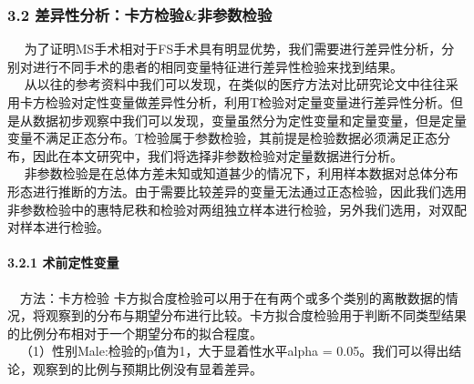 \documentclass[
]{article}
\newenvironment{Shaded}{\begin{snugshade}}{\end{snugshade}}
\newcommand{\AttributeTok}[1]{\textcolor[rgb]{0.77,0.63,0.00}{#1}}
\newcommand{\FunctionTok}[1]{\textcolor[rgb]{0.00,0.00,0.00}{#1}}
\newcommand{\NormalTok}[1]{#1}
\newcommand{\OtherTok}[1]{\textcolor[rgb]{0.56,0.35,0.01}{#1}}
\newcommand{\SpecialCharTok}[1]{\textcolor[rgb]{0.00,0.00,0.00}{#1}}
\newcommand{\StringTok}[1]{\textcolor[rgb]{0.31,0.60,0.02}{#1}}
\begin{document}
\hypertarget{ux5deeux5f02ux6027ux5206ux6790ux5361ux65b9ux68c0ux9a8cux975eux53c2ux6570ux68c0ux9a8c}{%
\subsubsection{3.2
差异性分析：卡方检验\&非参数检验}\label{ux5deeux5f02ux6027ux5206ux6790ux5361ux65b9ux68c0ux9a8cux975eux53c2ux6570ux68c0ux9a8c}}

 
为了证明MS手术相对于FS手术具有明显优势，我们需要进行差异性分析，分别对进行不同手术的患者的相同变量特征进行差异性检验来找到结果。\\
 
从以往的参考资料中我们可以发现，在类似的医疗方法对比研究论文中往往采用卡方检验对定性变量做差异性分析，利用T检验对定量变量进行差异性分析。但是从数据初步观察中我们可以发现，变量虽然分为定性变量和定量变量，但是定量变量不满足正态分布。T检验属于参数检验，其前提是检验数据必须满足正态分布，因此在本文研究中，我们将选择非参数检验对定量数据进行分析。\\
 
非参数检验是在总体方差未知或知道甚少的情况下，利用样本数据对总体分布形态进行推断的方法。由于需要比较差异的变量无法通过正态检验，因此我们选用非参数检验中的惠特尼秩和检验对两组独立样本进行检验，另外我们选用，对双配对样本进行检验。

\hypertarget{ux672fux524dux5b9aux6027ux53d8ux91cf-1}{%
\paragraph{3.2.1
术前定性变量}\label{ux672fux524dux5b9aux6027ux53d8ux91cf-1}}

 方法：卡方检验
卡方拟合度检验可以用于在有两个或多个类别的离散数据的情况，将观察到的分布与期望分布进行比较。卡方拟合度检验用于判断不同类型结果的比例分布相对于一个期望分布的拟合程度。\\
 （1）性别Male:检验的p值为1，大于显着性水平alpha =
0.05。我们可以得出结论，观察到的比例与预期比例没有显着差异。

\begin{Shaded}
\end{Shaded}
\end{document}
